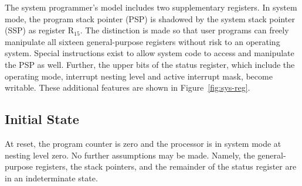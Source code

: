 \documentclass[12pt,english]{book}
\begin{document}
The system programmer's model includes two supplementary registers.
In system mode, the program stack pointer (PSP)
is shadowed by the system stack pointer (SSP)
as register \(\text{R}_{15}\).
The distinction is made so that user programs
can freely manipulate all sixteen general-purpose registers
without risk to an operating system.
Special instructions exist to allow system code
to access and manipulate the PSP as well.
Further, the upper bits of the status register,
which include the operating mode,
interrupt nesting level and active interrupt mask,
become writable.
These additional features are shown in Figure~\ref{fig:sys-reg}.

\subsection{Initial State}
At reset, the program counter is zero
and the processor is in system mode at nesting level zero.
No further assumptions may be made.
Namely, the general-purpose registers,
the stack pointers,
and the remainder of the status register are in an indeterminate state.
\end{document}
